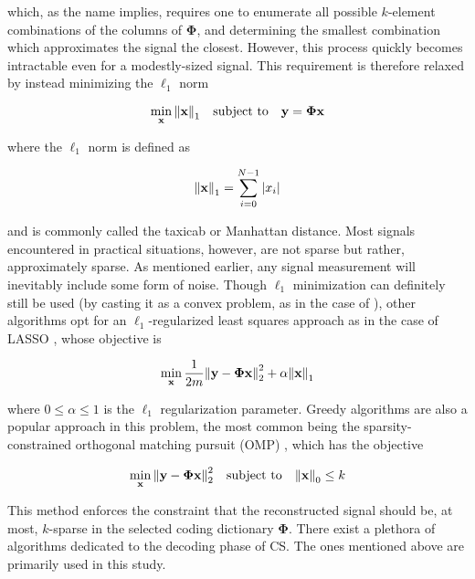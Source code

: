\noindent which, as the name implies, requires one to enumerate all possible $k$-element combinations of the columns of $\bm\Phi$, and determining the smallest combination which approximates the signal the closest. However, this process quickly becomes intractable even for a modestly-sized signal. This requirement is therefore relaxed by instead minimizing the $\ell_1$ norm

\begin{equation}\label{eq:min-l1}
	\min_{\text{\bfseries x}} \norm{\text{\bfseries x}}_1 \quad \textrm{subject to} \quad \text{\bfseries y} = \bm\Phi \text{\bfseries x}
\end{equation}

\noindent where the $\ell_1$ norm is defined as

\begin{equation}\label{eq:l1-norm}
	\norm{\text{\bfseries x}}_1 = \sum_{i=0}^{N-1} \abs{x_i}
\end{equation}

\noindent and is commonly called the taxicab or Manhattan distance. Most signals encountered in practical situations, however, are not sparse but rather, approximately sparse. As mentioned earlier, any signal measurement will inevitably include some form of noise. Though $\ell_1$ minimization can definitely still be used (by casting it as a convex problem, as in the case of \cite{cvxpy,cvxpy_rewriting}), other algorithms opt for an $\ell_1$-regularized least squares approach as in the case of LASSO \cite{scikit-learn}, whose objective is

\begin{equation}\label{eq:lasso}
	\min_{\text{\bfseries x}} \frac{1}{2m} \norm{\text{\bfseries y} - \bm\Phi\text{\bfseries x}}_2^2 + \alpha\norm{\text{\bfseries x}}_1
\end{equation}

\noindent where $0 \leq \alpha \leq 1$ is the $\ell_1$ regularization parameter. Greedy algorithms are also a popular approach in this problem, the most common being the sparsity-constrained orthogonal matching pursuit (OMP) \cite{Rubinstein2008}, which has the objective

\begin{equation}
	\min_{\text{\bfseries x}} \norm{\text{\bfseries y} - \bm\Phi \text{\bfseries x}}_2^2 \quad \textrm{subject to} \quad \norm{\text{\bfseries x}}_0 \leq k
\end{equation}

\noindent This method enforces the constraint that the reconstructed signal should be, at most, $k$-sparse in the selected coding dictionary $\bm\Phi$. There exist a plethora of algorithms dedicated to the decoding phase of CS. The ones mentioned above are primarily used in this study.